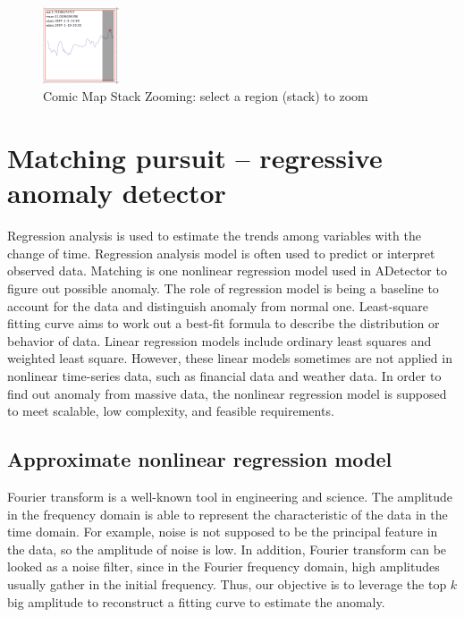 \documentclass{vgtc}                          %
\begin{document}
\begin{figure}[htb]
	\centering
	\includegraphics[width=0.20\textwidth]{zoom.jpg}
	\caption{Comic Map Stack Zooming: select a region (stack) to zoom}
	\label{fig:zoom}
\end{figure}

\section{Matching pursuit -- regressive anomaly detector}

Regression analysis is used to estimate the trends among variables with the change of time. Regression analysis model is often used to predict or interpret observed data. Matching is one nonlinear regression model used in ADetector to figure out possible anomaly. The role of regression model is being a baseline to account for the data and distinguish anomaly from normal one. Least-square fitting curve aims to work out a best-fit formula to describe the distribution or behavior of data. Linear regression models include ordinary least squares and weighted least square. However, these linear models sometimes are not applied in nonlinear time-series data, such as financial data and weather data. In order to find out anomaly from massive data, the nonlinear regression model is supposed to meet scalable, low complexity, and feasible requirements.

\subsection{Approximate nonlinear regression model}

Fourier transform is a well-known tool in engineering and science. The amplitude in the frequency domain is able to represent the characteristic of the data in the time domain. For example, noise is not supposed to be the principal feature in the data, so the amplitude of noise is low. In addition, Fourier transform can be looked as a noise filter, since in the Fourier frequency domain, high amplitudes usually gather in the initial frequency. Thus, our objective is to leverage the top $k$ big amplitude to reconstruct a fitting curve to estimate the anomaly. 
\end{document}
